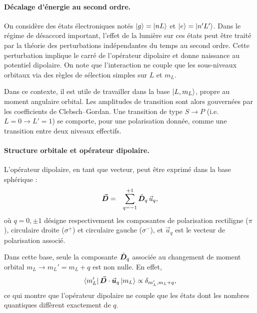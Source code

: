 \vspace{1em}

\paragraph{Décalage d’énergie au second ordre.}
On considère des états électroniques notés $\ket{g} = \ket{nL}$ et $\ket{e} = \ket{n'L'}$. Dans le régime de désaccord important, l’effet de la lumière sur ces états peut être traité par la théorie des perturbations indépendantes du temps au second ordre. Cette perturbation implique le carré de l’opérateur dipolaire et donne naissance au potentiel dipolaire. On note que l’interaction ne couple que les sous-niveaux orbitaux via des règles de sélection simples sur $L$ et $m_L$.

Dans ce contexte, il est utile de travailler dans la base $\ket{L, m_L}$, propre au moment angulaire orbital. Les amplitudes de transition sont alors gouvernées par les coefficients de Clebsch–Gordan. Une transition de type $S \rightarrow P$ (i.e. $L = 0 \to L' = 1$) se comporte, pour une polarisation donnée, comme une transition entre deux niveaux effectifs.

\paragraph{Structure orbitale et opérateur dipolaire.}

L’opérateur dipolaire, en tant que vecteur, peut être exprimé dans la base sphérique :
\begin{eqnarray}
\vec{{\bm{D}}} &=& \sum_{q = -1}^{+1} \hat{\bm{D}}_q\, \vec{u}_q,
\end{eqnarray}
où $q = 0, \pm 1$ désigne respectivement les composantes de polarisation rectiligne ($\pi$), circulaire droite ($\sigma^+$) et circulaire gauche ($\sigma^-$), et $\vec{u}_q$ est le vecteur de polarisation associé.

Dans cette base, seule la composante $\hat{\bm{D}}_q$ associée au changement de moment orbital  $m_L \to m_L' = m_L + q$ est non nulle. En effet,
\begin{eqnarray}\label{chap7:dipolaire:eq:selection_rule}
\bra{m_L'} \vec{{\bm{D}}} \cdot \vec{{\bm{u}}}_q \ket{m_L} \propto \delta_{m_L', m_L + q},
\end{eqnarray}
ce qui montre que l’opérateur dipolaire ne couple que les états dont les nombres quantiques diffèrent exactement de $q$.

